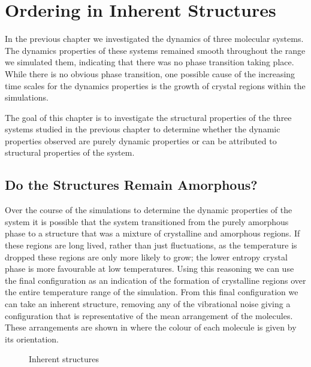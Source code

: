 \chapter{Ordering in Inherent Structures}

In the previous chapter we investigated the dynamics of three molecular systems. The dynamics properties of these systems remained smooth throughout the range we simulated them, indicating that there was no phase transition taking place. While there is no obvious phase transition, one possible cause of the increasing time scales for the dynamics properties is the growth of crystal regions within the simulations.

The goal of this chapter is to investigate the structural properties of the three systems studied in the previous chapter to determine whether the dynamic properties observed are purely dynamic properties or can be attributed to structural properties of the system.

\section{Do the Structures Remain Amorphous?}

Over the course of the simulations to determine the dynamic properties of the system it is possible that the system transitioned from the purely amorphous phase to a structure that was a mixture of crystalline and amorphous regions. If these regions are long lived, rather than just fluctuations, as the temperature is dropped these regions are only more likely to grow; the lower entropy crystal phase is more favourable at low temperatures. Using this reasoning we can use the final configuration as an indication of the formation of crystalline regions over the entire temperature range of the simulation. From this final configuration we can take an inherent structure, removing any of the vibrational noise giving a configuration that is representative of the mean arrangement of the molecules. These arrangements are shown in  where the colour of each molecule is given by its orientation.

\begin{figure}
    \caption{Inherent structures}
    \label{fig:inherent structures frame}
\end{figure}

